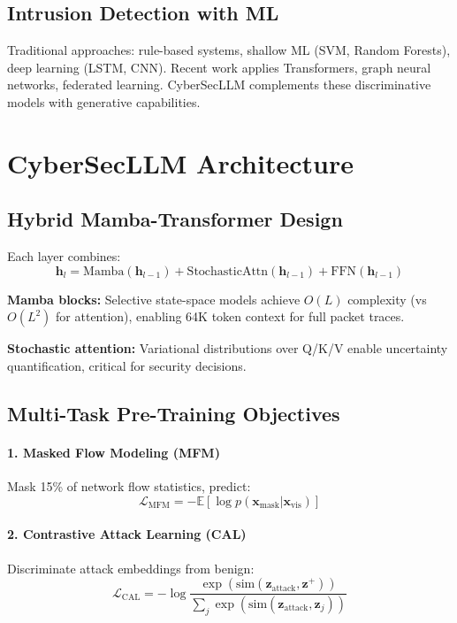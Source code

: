 \documentclass{article}
\begin{document}
\subsection{Intrusion Detection with ML}
Traditional approaches: rule-based systems, shallow ML (SVM, Random Forests), deep learning (LSTM, CNN). Recent work applies Transformers, graph neural networks, federated learning. CyberSecLLM complements these discriminative models with generative capabilities.

\section{CyberSecLLM Architecture}

\subsection{Hybrid Mamba-Transformer Design}

Each layer combines:
\begin{equation}
\mathbf{h}_l = \text{Mamba}(\mathbf{h}_{l-1}) + \text{StochasticAttn}(\mathbf{h}_{l-1}) + \text{FFN}(\mathbf{h}_{l-1})
\end{equation}

\textbf{Mamba blocks:} Selective state-space models achieve $O(L)$ complexity (vs $O(L^2)$ for attention), enabling 64K token context for full packet traces.

\textbf{Stochastic attention:} Variational distributions over Q/K/V enable uncertainty quantification, critical for security decisions.

\subsection{Multi-Task Pre-Training Objectives}

\paragraph{1. Masked Flow Modeling (MFM)}
Mask 15\% of network flow statistics, predict:
\begin{equation}
\mathcal{L}_{\text{MFM}} = -\mathbb{E}[\log p(\mathbf{x}_{\text{mask}} | \mathbf{x}_{\text{vis}})]
\end{equation}

\paragraph{2. Contrastive Attack Learning (CAL)}
Discriminate attack embeddings from benign:
\begin{equation}
\mathcal{L}_{\text{CAL}} = -\log \frac{\exp(\text{sim}(\mathbf{z}_{\text{attack}}, \mathbf{z}^+))}{\sum_j \exp(\text{sim}(\mathbf{z}_{\text{attack}}, \mathbf{z}_j))}
\end{equation}
\end{document}

